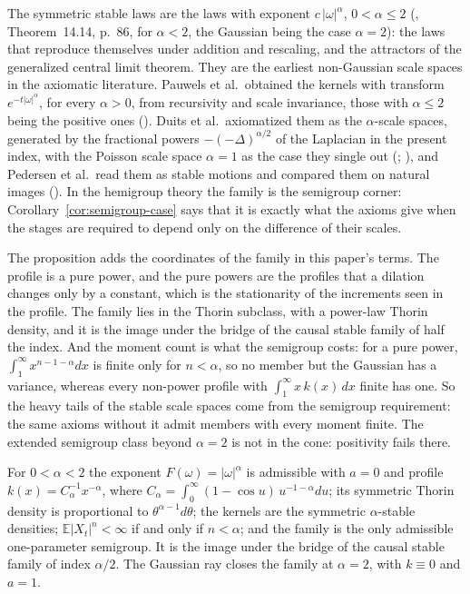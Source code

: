 The symmetric stable laws are the laws with exponent $c\,|\omega|^\alpha$, $0 < \alpha \le 2$
(, Theorem~14.14, p.~86, for $\alpha < 2$, the Gaussian being the case
$\alpha = 2$): the laws that reproduce themselves under
addition and rescaling, and the attractors of the generalized central limit theorem. They are
the earliest non-Gaussian scale spaces in the axiomatic literature. Pauwels et al.\ obtained
the kernels with transform
$e^{-t|\omega|^\alpha}$, for every $\alpha > 0$, from recursivity and scale invariance, those
with $\alpha \le 2$ being the positive ones (). Duits et
al.\ axiomatized them as the $\alpha$-scale spaces, generated by the fractional powers
$-(-\Delta)^{\alpha/2}$ of the Laplacian in the present index, with the Poisson scale space
$\alpha = 1$ as the case they single out (;
), and Pedersen et al.\ read them as stable \Levy{} motions and
compared them on natural images (). In the hemigroup theory the
family is the semigroup corner: Corollary~\ref{cor:semigroup-case} says that it is exactly what
the axioms give when the stages are required to depend only on the difference of their scales.

The proposition adds the coordinates of the family in this paper's terms. The profile is a pure
power, and the pure powers are the profiles that a dilation changes only by a constant, which
is the stationarity of the increments seen in the profile. The family lies in the Thorin
subclass, with a power-law Thorin density, and it is the image under the bridge of the causal
stable family of half the index. And the moment count is what the semigroup costs: for a pure
power, $\int_1^\infty x^{n-1-\alpha}dx$ is finite only for $n < \alpha$, so no member but the
Gaussian has a variance, whereas every non-power profile with $\int_1^\infty x\,k(x)\,dx$
finite has one. So the heavy tails of the stable scale spaces come from the semigroup
requirement: the same axioms without it admit members with every moment finite. The extended
semigroup class beyond $\alpha = 2$ is not in the cone: positivity fails there.

\begin{proposition}\label{prop:stable-family}
For $0 < \alpha < 2$ the exponent $F(\omega) = |\omega|^\alpha$ is admissible with $a = 0$ and
profile $k(x) = C_\alpha^{-1}x^{-\alpha}$, where
$C_\alpha = \int_0^\infty (1-\cos u)\,u^{-1-\alpha}du$; its symmetric Thorin density is
proportional to $\theta^{\alpha-1}d\theta$; the kernels are the symmetric $\alpha$-stable
densities; $\mathbb{E}|X_t|^n < \infty$ if and only if $n < \alpha$; and the family is the only
admissible one-parameter semigroup. It is the image under the bridge of the causal stable family
of index $\alpha/2$. The Gaussian ray closes the family at $\alpha = 2$, with $k \equiv 0$ and
$a = 1$.
\end{proposition}

